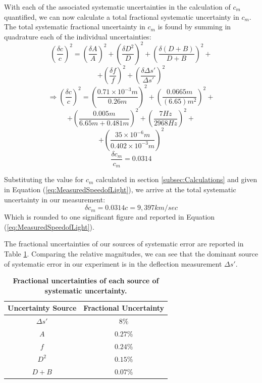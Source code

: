 \documentclass[twocolumn]{article}
\begin{document}
		With each of the associated systematic uncertainties in the calculation of $c_m$ quantified, we can now calculate a total fractional systematic uncertainty in $c_m$.
		The total systematic fractional uncertainty in $c_m$ is found by summing in quadrature each of the individual uncertainties:
		\begin{equation*}
			\left( \frac{\delta c}{c} \right)^2 = \left(\frac{\delta A}{A} \right) ^2 + \left(\frac{\delta D^2}{D} \right)^2 + \left(\frac{\delta \left(D+B \right)}{D+B} \right)^2 +
		\end{equation*} 
		\begin{equation*}
			+ \left(\frac{\delta f}{f}\right)^2 + \left(\frac{\delta \Delta s'}{\Delta s'}\right)^2
		\end{equation*}
		\begin{equation*}
			\Rightarrow \left( \frac{\delta c}{c}\right)^2 = \left(\frac{0.71\times10^{-3}m}{0.26m}\right)^2 + \left(\frac{0.0665m}{(6.65)m^2}\right)^2 +
		\end{equation*}
		\begin{equation*}
			+ \left(\frac{0.005m}{6.65m + 0.481m}\right)^2 + \left(\frac{7 Hz}{2968Hz}\right)^2 + 
		\end{equation*}
		\begin{equation*}
			+ \left(\frac{35\times 10^{-6}m}{0.402\times 10^{-3}m}\right)^2
		\end{equation*}
		\begin{equation}
			\frac{\delta c_m}{c_m} = 0.0314
		\end{equation}
		
		Substituting the value for $c_m$ calculated in section \ref{subsec:Calculations} and given in Equation (\ref{eq:MeasuredSpeedofLight}), we arrive at the total systematic uncertainty in our measurement:
		\begin{equation} \label{eq:as}
			\delta c_m = 0.0314c = 9,397 km/sec
		\end{equation}
		Which is rounded to one significant figure and reported in Equation (\ref{eq:MeasuredSpeedofLight}).
		
		The fractional uncertainties of our sources of systematic error are reported in Table \ref{tab:FracSystemUncert}.
		Comparing the relative magnitudes, we can see that the dominant source of systematic error in our experiment is in the deflection measurement $\Delta s'$.
		
		
		\begin{table}[t]
			\centering
			\begin{tabular}{c|c}
				Uncertainty Source	&	Fractional Uncertainty	\\ \hline
				$\Delta s'$	&	$8\%$	\\
				$A$ & $0.27\%$ \\
				$f$	&	$0.24\%$	\\
				$D^2$	&	$0.15\%$ \\
				$D+B$	&	$0.07\%$\\
			\end{tabular}
			\caption{\textbf{Fractional uncertainties of each source of systematic uncertainty.}}
			\label{tab:FracSystemUncert}
		\end{table}
		
\end{document}
